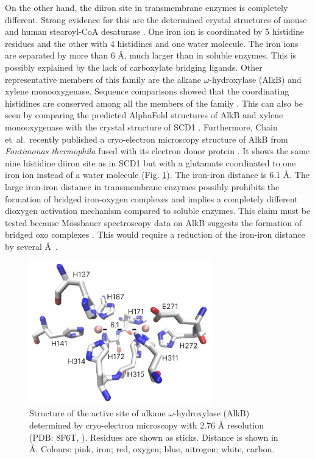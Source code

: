 On the other hand, the diiron site in transmembrane enzymes is completely different. Strong evidence for this are the determined crystal structures of mouse and human stearoyl-CoA desaturase \cite{Bai2015,Wang2015}. One iron ion is coordinated by 5 histidine residues and the other with 4 histidines and one water molecule. The iron ions are separated by more than 6 Å, much larger than in soluble enzymes. This is possibly explained by the lack of carboxylate bridging ligands. Other representative members of this family are the alkane $\omega$-hydroxylase (AlkB) and xylene monooxygenase. Sequence comparisons showed that the coordinating histidines are conserved among all the members of the family \cite{Shanklin1994}. This can also be seen by comparing the predicted AlphaFold structures of AlkB and xylene monooxygenase with the crystal structure of SCD1 \cite{Varadi2022}. Furthermore, Chain et~al.~recently published a cryo-electron microscopy structure of AlkB from \textit{Fontimonas thermophila} fused with its electron donor protein \cite{Chai2023}. It shows the same nine histidine diiron site as in SCD1 but with a glutamate coordinated to one iron ion instead of a water molecule (Fig. \ref{fig:AlkB_structure}). The iron-iron distance is 6.1 Å. The large iron-iron distance in transmembrane enzymes possibly prohibits the formation of bridged iron-oxygen complexes and implies a completely different dioxygen activation mechanism compared to soluble enzymes. This claim must be tested because M\"ossbauer spectroscopy data on AlkB suggests the formation of bridged oxo complexes \cite{Shanklin1997}. This would require a reduction of the iron-iron distance by several Å~\cite{Shu1997}.

\begin{figure}[htbp]
    \centering
    \includegraphics[width=0.7\textwidth]{Figures/8f6t.png}
    \caption{Structure of the active site of alkane $\omega$-hydroxylase (AlkB) determined by cryo-electron microscopy with 2.76 Å resolution (PDB: 8F6T, \cite{Chai2023}). Residues are shown as sticks. Distance is shown in Å. Colours: pink, iron; red, oxygen; blue, nitrogen; white, carbon.}
    \label{fig:AlkB_structure}
\end{figure}


